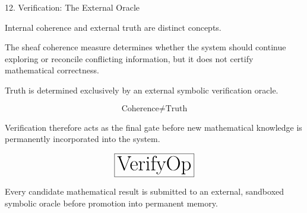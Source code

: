 %
%

\begin{mosbox}{12. Verification: The External Oracle}

\BodyFont

Internal coherence and external truth are distinct concepts.

The sheaf coherence measure determines whether the system should continue
exploring or reconcile conflicting information, but it does not certify
mathematical correctness.

Truth is determined exclusively by an external symbolic verification
oracle.

\[
\boxed{
\text{Coherence}
\neq
\text{Truth}
}
\]

Verification therefore acts as the final gate before new mathematical
knowledge is permanently incorporated into the system.

\end{mosbox}


\begin{eqbox}

\[
\Huge
\boxed{
\mathrm{VerifyOp}
}
\]

\vspace{3mm}

\BodyFont

Every candidate mathematical result is submitted to an external,
sandboxed symbolic oracle before promotion into permanent memory.

\end{eqbox}



